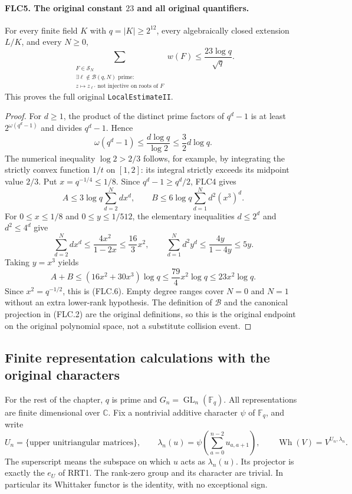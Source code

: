 \paragraph{FLC5. The original constant $23$ and all original quantifiers.}
\label{claim:FLC5}
For every finite field $K$ with $q=|K|\ge2^{12}$, every
algebraically closed extension $L/K$, and every $N\ge0$,
\[
 \sum_{\substack{F\in\mathcal S_N\\
       \exists\ell\notin\mathcal B(q,N)\text{ prime}:\\
       z\mapsto z_{\ell'}\text{ not injective on roots of }F}}
       w(F)\le\frac{23\log q}{\sqrt q}.
 \tag{FLC.6}
\]
This proves the full original \texttt{LocalEstimateII}.
\begin{proof}
For $d\ge1$, the product of the distinct prime factors of
$q^d-1$ is at least $2^{\omega(q^d-1)}$ and divides $q^d-1$.
Hence
\[
 \omega(q^d-1)\le\frac{d\log q}{\log2}
                         \le\frac32d\log q.
\]
The numerical inequality $\log2>2/3$ follows, for example,
by integrating the strictly convex function $1/t$ on $[1,2]$:
its integral strictly exceeds its midpoint value $2/3$.
Put $x=q^{-1/4}\le1/8$.  Since $q^d-1\ge q^d/2$,
FLC4 gives
\[
 A\le3\log q\sum_{d=2}^N d x^d,\qquad
 B\le6\log q\sum_{d=1}^N d^2(x^3)^d.
 \tag{FLC.7}
\]
For $0\le x\le1/8$ and $0\le y\le1/512$, the elementary
inequalities $d\le2^d$ and $d^2\le4^d$ give
\[
 \sum_{d=2}^N d x^d\le\frac{4x^2}{1-2x}
                          \le\frac{16}{3}x^2,\qquad
 \sum_{d=1}^N d^2y^d\le\frac{4y}{1-4y}\le5y.
\]
Taking $y=x^3$ yields
\[
 A+B\le(16x^2+30x^3)\log q
       \le\frac{79}{4}x^2\log q
       \le23x^2\log q.
\]
Since $x^2=q^{-1/2}$, this is (FLC.6).  Empty degree ranges
cover $N=0$ and $N=1$ without an extra lower-rank hypothesis.
The definition of $\mathcal B$ and the canonical projection in
(FLC.2) are the original definitions, so this is the original
endpoint on the original polynomial space, not a substitute
collision event.
\end{proof}

\subsection{Finite representation calculations with the original characters}

For the rest of the chapter, $q$ is prime and
$G_n=\operatorname{GL}_n(\mathbb F_q)$.  All representations are
finite dimensional over $\mathbb C$.  Fix a nontrivial additive
character $\psi$ of $\mathbb F_q$, and write
\[
 U_n=\{\text{upper unitriangular matrices}\},\qquad
 \lambda_n(u)=\psi\left(\sum_{a=0}^{n-2}u_{a,a+1}\right),\qquad
 \operatorname{Wh}(V)=V^{U_n,\lambda_n}.
 \tag{FLC.8}
\]
The superscript means the subspace on which $u$ acts as
$\lambda_n(u)$.  Its projector is exactly the $e_U$ of RRT1.
The rank-zero group and its character are trivial.  In particular
its Whittaker functor is the identity, with no exceptional sign.

